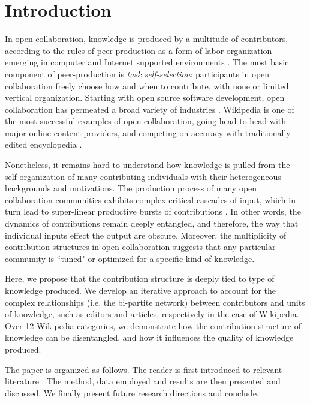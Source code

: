 \section{Introduction}
In open collaboration, knowledge is produced by a multitude of contributors, according to the rules of peer-production as a form of labor organization emerging in computer and Internet supported environments \cite{benkler2002}. The most basic component of peer-production is {\it task self-selection}: participants in open collaboration freely choose how and when to contribute, with none or limited vertical organization.  Starting with open source software development, open collaboration has permeated a broad variety of industries \cite{benkler2011leviathan}. Wikipedia is one of the most successful examples of open collaboration, going head-to-head with major online content providers, and competing on accuracy with traditionally edited encyclopedia \cite{giles2005internet}. 

Nonetheless, it remains hard to understand how knowledge is pulled from the self-organization of many contributing individuals with their heterogeneous backgrounds and motivations. The production process of many open collaboration communities exhibits complex critical cascades of input, which in turn lead to super-linear productive bursts of contributions \cite{sornette2014howmuch}. In other words, the dynamics of contributions remain deeply entangled, and therefore, the way that individual inputs effect the output are obscure. Moreover, the multiplicity of contribution structures in open collaboration suggests that any particular community is ``tuned" or optimized for a specific kind of knowledge. 

Here, we propose that the contribution structure is deeply tied to type of knowledge produced. We develop an iterative approach to account for the complex relationships (i.e. the bi-partite network) between contributors and units of knowledge, such as editors and articles, respectively in the case of Wikipedia. Over 12 Wikipedia categories, we demonstrate how the contribution structure of knowledge can be disentangled, and how it influences the quality of knowledge produced.

The paper is organized as follows. The reader is first introduced to relevant literature . The method, data employed and results are then presented and discussed. We finally present future research directions and conclude.